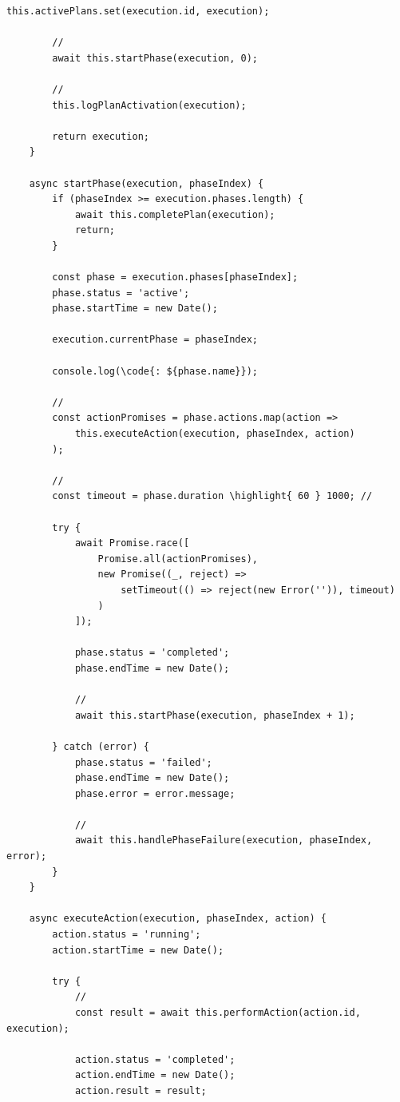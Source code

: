\begin{lstlisting}[style=javascript]
        this.activePlans.set(execution.id, execution);
        
        // 
        await this.startPhase(execution, 0);
        
        // 
        this.logPlanActivation(execution);
        
        return execution;
    }
    
    async startPhase(execution, phaseIndex) {
        if (phaseIndex >= execution.phases.length) {
            await this.completePlan(execution);
            return;
        }
        
        const phase = execution.phases[phaseIndex];
        phase.status = 'active';
        phase.startTime = new Date();
        
        execution.currentPhase = phaseIndex;
        
        console.log(\code{: ${phase.name}});
        
        // 
        const actionPromises = phase.actions.map(action => 
            this.executeAction(execution, phaseIndex, action)
        );
        
        // 
        const timeout = phase.duration \highlight{ 60 } 1000; // 
        
        try {
            await Promise.race([
                Promise.all(actionPromises),
                new Promise((_, reject) => 
                    setTimeout(() => reject(new Error('')), timeout)
                )
            ]);
            
            phase.status = 'completed';
            phase.endTime = new Date();
            
            // 
            await this.startPhase(execution, phaseIndex + 1);
            
        } catch (error) {
            phase.status = 'failed';
            phase.endTime = new Date();
            phase.error = error.message;
            
            // 
            await this.handlePhaseFailure(execution, phaseIndex, error);
        }
    }
    
    async executeAction(execution, phaseIndex, action) {
        action.status = 'running';
        action.startTime = new Date();
        
        try {
            // 
            const result = await this.performAction(action.id, execution);
            
            action.status = 'completed';
            action.endTime = new Date();
            action.result = result;
            

\end{lstlisting}
